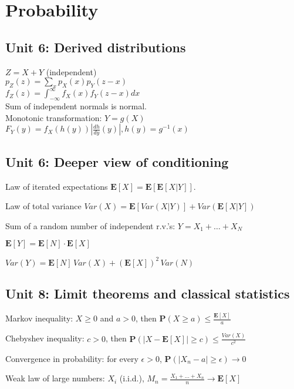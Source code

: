 \section{Probability} 

\subsection*{Unit 6: Derived distributions}
$Z = X+Y$ (independent)\\
$p_Z(z) = \sum_x p_X(x) p_Y(z-x)$\\
$f_Z(z) = \int_{-\infty}^{\infty} f_X(x) f_Y(z-x) dx$\\
Sum of independent normals is normal.\\

Monotonic transformation: $Y = g(X)$\\
$F_Y(y) = f_X(h(y))\left|\frac{dh}{dy}(y)\right|, h(y) = g^{-1}(x)$

\subsection*{Unit 6: Deeper view of conditioning}

Law of iterated expectations $\mathbf{E}[X] = \mathbf{E}\left[\mathbf{E}[X|Y] \right]$.

Law of total variance $Var(X) = \mathbf{E}\left[Var(X|Y)\right] + Var(\mathbf{E}[X|Y])$

Sum of a random number of independent r.v.'s: $Y = X_1 + \ldots + X_N$

$\mathbf{E}[Y] = \mathbf{E}[N] \cdot \mathbf{E}[X]$

$Var(Y) = \mathbf{E}[N]\,Var(X) + (\mathbf{E}[X])^2\,Var(N)$


\subsection*{Unit 8: Limit theorems and classical statistics}

Markov inequality: $X \geq 0$ and $a > 0$, then $\mathbf{P}(X \geq a) \leq \frac{\mathbf{E}[X]}{a}$

Chebyshev inequality: $c > 0$, then $\mathbf{P}(|X - \mathbf{E}[X]| \geq c) \leq \frac{Var(X)}{c^2}$

Convergence in probability: for every $\epsilon > 0$, $\mathbf{P}(|X_n - a| \geq \epsilon) \rightarrow 0$

Weak law of large numbers: $X_i$ (i.i.d.), $M_n = \frac{X_1 + \ldots + X_n}{n} \rightarrow \mathbf{E}[X]$

